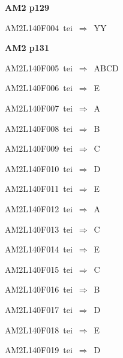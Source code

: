 \par\vfill\eject
{\bf\hfill AM2 p129\hfill\hbox{}}\par\bigskip
{\sixrm AM2L140F004\ {\sixit tei}\ }$\Rightarrow$\ YY\par\smallskip

\par\vfill\eject
{\bf\hfill AM2 p131\hfill\hbox{}}\par\bigskip
{\sixrm AM2L140F005\ {\sixit tei}\ }$\Rightarrow$\ ABCD\par\smallskip
{\sixrm AM2L140F006\ {\sixit tei}\ }$\Rightarrow$\ E\par\smallskip
{\sixrm AM2L140F007\ {\sixit tei}\ }$\Rightarrow$\ A\par\smallskip
{\sixrm AM2L140F008\ {\sixit tei}\ }$\Rightarrow$\ B\par\smallskip
{\sixrm AM2L140F009\ {\sixit tei}\ }$\Rightarrow$\ C\par\smallskip
{\sixrm AM2L140F010\ {\sixit tei}\ }$\Rightarrow$\ D\par\smallskip
{\sixrm AM2L140F011\ {\sixit tei}\ }$\Rightarrow$\ E\par\smallskip
{\sixrm AM2L140F012\ {\sixit tei}\ }$\Rightarrow$\ A\par\smallskip
{\sixrm AM2L140F013\ {\sixit tei}\ }$\Rightarrow$\ C\par\smallskip
{\sixrm AM2L140F014\ {\sixit tei}\ }$\Rightarrow$\ E\par\smallskip
{\sixrm AM2L140F015\ {\sixit tei}\ }$\Rightarrow$\ C\par\smallskip
{\sixrm AM2L140F016\ {\sixit tei}\ }$\Rightarrow$\ B\par\smallskip
{\sixrm AM2L140F017\ {\sixit tei}\ }$\Rightarrow$\ D\par\smallskip
{\sixrm AM2L140F018\ {\sixit tei}\ }$\Rightarrow$\ E\par\smallskip
{\sixrm AM2L140F019\ {\sixit tei}\ }$\Rightarrow$\ D\par\smallskip

